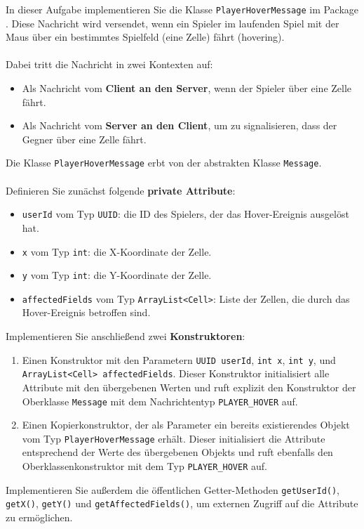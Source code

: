 \documentclass[12pt]{article}
\begin{document}
In dieser Aufgabe implementieren Sie die Klasse \texttt{PlayerHoverMessage} im Package . 
Diese Nachricht wird versendet, wenn ein Spieler im laufenden Spiel mit der Maus über ein bestimmtes Spielfeld (eine Zelle) fährt (\glqq hovering\grqq).
\\ \\
Dabei tritt die Nachricht in zwei Kontexten auf:
\begin{itemize}
    \item Als Nachricht vom \textbf{Client an den Server}, wenn der Spieler über eine Zelle fährt.
    \item Als Nachricht vom \textbf{Server an den Client}, um zu signalisieren, dass der Gegner über eine Zelle fährt.
\end{itemize}
Die Klasse \texttt{PlayerHoverMessage} erbt von der abstrakten Klasse \texttt{Message}.
\\ \\
Definieren Sie zunächst folgende \textbf{private Attribute}:
\begin{itemize}
    \item \texttt{userId} vom Typ \texttt{UUID}: die ID des Spielers, der das Hover-Ereignis ausgelöst hat.
    \item \texttt{x} vom Typ \texttt{int}: die X-Koordinate der Zelle.
    \item \texttt{y} vom Typ \texttt{int}: die Y-Koordinate der Zelle.
    \item \texttt{affectedFields} vom Typ \texttt{ArrayList\hspace{0pt}<Cell>}: Liste der Zellen, die durch das Hover-Ereignis betroffen sind.
\end{itemize}
Implementieren Sie anschließend zwei \textbf{Konstruktoren}:
\begin{enumerate}
    \item Einen Konstruktor mit den Parametern \texttt{UUID userId}, \texttt{int x}, \texttt{int y}, und \texttt{ArrayList\hspace{0pt}<Cell> \hspace{0pt}affectedFields}. Dieser Konstruktor initialisiert alle Attribute mit den übergebenen Werten und ruft explizit den Konstruktor der Oberklasse \texttt{Message} mit dem Nachrichtentyp \texttt{PLAYER\_HOVER} auf.
    \item Einen Kopierkonstruktor, der als Parameter ein bereits existierendes Objekt vom Typ \texttt{PlayerHoverMessage} erhält. Dieser initialisiert die Attribute entsprechend der Werte des übergebenen Objekts und ruft ebenfalls den Oberklassenkonstruktor mit dem Typ \texttt{PLAYER\_HOVER} auf.
\end{enumerate}
Implementieren Sie außerdem die öffentlichen Getter-Methoden \texttt{getUserId()}, \texttt{getX()}, \texttt{getY()} und \texttt{getAffectedFields()}, 
um externen Zugriff auf die Attribute zu ermöglichen.
\end{document}
